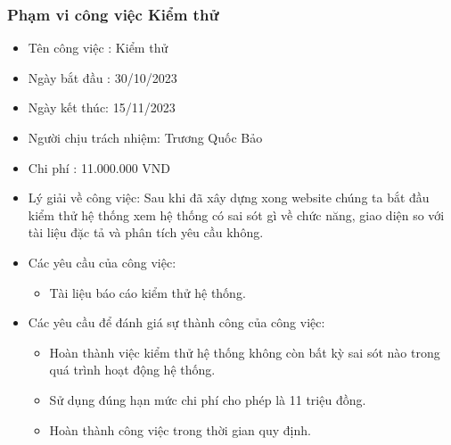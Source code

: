 \documentclass[12pt]{article}
\begin{document}
\subsubsection{Phạm vi công việc Kiểm thử}
\begin{itemize}[label=-, leftmargin=1cm]
    \item Tên công việc : Kiểm thử
    \item Ngày bắt đầu : 30/10/2023
    \item Ngày kết thúc: 15/11/2023
    \item Người chịu trách nhiệm: Trương Quốc Bảo
    \item Chi phí : 11.000.000 VND
    \item Lý giải về công việc: Sau khi đã xây dựng xong website chúng ta bắt đầu kiểm thử hệ thống xem hệ thống có sai sót gì về chức năng, giao diện so với tài liệu đặc tả và phân tích yêu cầu không.
    \item Các yêu cầu của công việc:
    \begin{itemize}[label=+, leftmargin=1cm]
        \item Tài liệu báo cáo kiểm thử hệ thống.
    \end{itemize}
    \item Các yêu cầu để đánh giá sự thành công của công việc:
    \begin{itemize}[label=+, leftmargin=1cm]
        \item Hoàn thành việc kiểm thử hệ thống không còn bất kỳ sai sót nào trong quá trình hoạt động hệ thống.
        \item Sử dụng đúng hạn mức chi phí cho phép là 11 triệu đồng.
        \item Hoàn thành công việc trong thời gian quy định.
    \end{itemize}
\end{itemize}
\end{document}
